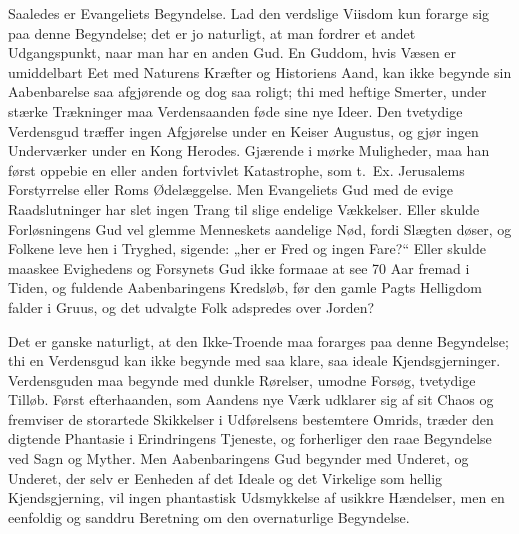 \documentclass[12pt,a4paper]{book}
\begin{document}
Saaledes er Evangeliets Begyndelse. Lad den verdslige Viisdom kun
forarge sig paa denne Begyndelse; det er jo naturligt, at man
fordrer et andet Udgangspunkt, naar man har en anden Gud. En
Guddom, hvis Væsen er umiddelbart Eet med Naturens Kræfter og
Historiens Aand, kan ikke begynde sin Aabenbarelse saa afgjørende
og dog saa roligt; thi med heftige Smerter, under stærke
Trækninger maa Verdensaanden føde sine nye Ideer. Den tvetydige
Verdensgud træffer ingen Afgjørelse under en Keiser Augustus, og
gjør ingen Underværker under en Kong Herodes. Gjærende i mørke
Muligheder, maa han først oppebie en eller anden fortvivlet
Katastrophe, som t.\ Ex. Jerusalems Forstyrrelse eller Roms
Ødelæggelse. Men Evangeliets Gud med de evige Raadslutninger har
slet ingen Trang til slige endelige Vækkelser. Eller skulde
Forløsningens Gud vel glemme Menneskets aandelige Nød, fordi
Slægten døser, og Folkene leve hen i Tryghed, sigende: „her er
Fred og ingen Fare?“ Eller skulde maaskee Evighedens og Forsynets
Gud ikke formaae at see 70 Aar fremad i Tiden, og fuldende
Aabenbaringens Kredsløb, før den gamle Pagts Helligdom falder i
Gruus, og det udvalgte Folk adspredes over Jorden?

Det er ganske naturligt, at den Ikke-Troende maa forarges paa
denne Begyndelse; thi en Verdensgud kan ikke begynde med saa
klare, saa ideale Kjendsgjerninger. Verdensguden maa begynde med
dunkle Rørelser, umodne Forsøg, tvetydige Tilløb. Først
efterhaanden, som Aandens nye Værk udklarer sig af sit Chaos og
fremviser de storartede Skikkelser i Udførelsens bestemtere
Omrids, træder den digtende Phantasie i Erindringens Tjeneste, og
forherliger den raae Begyndelse ved Sagn og Myther. Men
Aabenbaringens Gud begynder med Underet, og Underet, der selv
er Eenheden af det Ideale og det Virkelige som hellig
Kjendsgjerning, vil ingen phantastisk Udsmykkelse af usikkre
Hændelser, men en eenfoldig og sanddru Beretning om den
overnaturlige Begyndelse.
\end{document}
